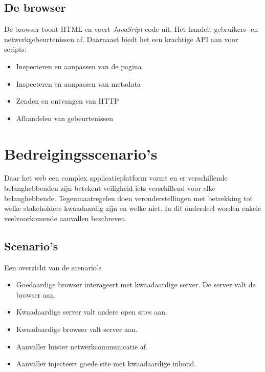 \documentclass[../main.tex]{subfiles}
\begin{document}
\subsection{De browser}
De browser toont HTML en voert \textit{JavaSript} code uit. Het handelt gebruikers- en netwerkgebeurtenissen af. Daarnaast biedt het een krachtige API aan voor scripts:
\begin{multicols}{2}
\begin{itemize}
	\item Inspecteren en aanpassen van de pagina
	\item Inspecteren en aanpassen van metadata
	\item Zenden en ontvangen van HTTP
	\item Afhandelen van gebeurtenissen
\end{itemize}
\end{multicols}

\section{Bedreigingsscenario's}
Daar het web een complex applicatieplatform vormt en er verschillende belanghebbenden zijn betekent veiligheid iets verschillend voor elke belanghebbende. Tegenmaatregelen doen veronderstellingen met betrekking tot welke stakeholders kwaadaardig zijn en welke niet. In dit onderdeel worden enkele veelvoorkomende aanvallen beschreven.

\subsection{Scenario's}
Een overzicht van de scenario's
\begin{itemize}
	\item Goedaardige browser interageert met kwaadaardige server. De server valt de browser aan.
	\item Kwaadaardige server valt andere open sites aan.
	\item Kwaadaardige browser valt server aan.
	\item Aanvaller luister netwerkcommunicatie af.
	\item Aanvaller injecteert goede site met kwaadaardige inhoud.
\end{itemize}
\end{document}
